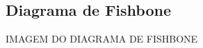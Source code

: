\begin{anexosenv}

  \partanexos

  \chapter{Diagrama de Fishbone}

    \label{fishbone}

    IMAGEM DO DIAGRAMA DE FISHBONE
 
\end{anexosenv}

